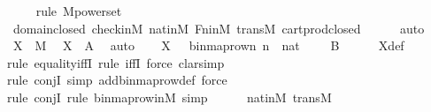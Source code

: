 \begin{isabellebody}
\ \ \ \ \isamarkupfalse%
{\isacharparenleft}{\kern0pt}rule\ M{\isacharunderscore}{\kern0pt}powerset{\isacharparenright}{\kern0pt}\isanewline
\ \ \ \ \isamarkupfalse%
\ domain{\isacharunderscore}{\kern0pt}closed\ check{\isacharunderscore}{\kern0pt}in{\isacharunderscore}{\kern0pt}M\ nat{\isacharunderscore}{\kern0pt}in{\isacharunderscore}{\kern0pt}M\ Fn{\isacharunderscore}{\kern0pt}in{\isacharunderscore}{\kern0pt}M\ transM\ cartprod{\isacharunderscore}{\kern0pt}closed\isanewline
\ \ \ \ \isamarkupfalse%
\ auto\isanewline
\isanewline
\ \ \isamarkupfalse%
\ \isamarkupfalse%
\ {\isachardoublequoteopen}X\ {\isasymin}\ M{\isachardoublequoteclose}\ \isamarkupfalse%
\ {\isacartoucheopen}X\ {\isacharequal}{\kern0pt}\ {\isacharquery}{\kern0pt}A{\isacartoucheclose}\ \isamarkupfalse%
\ auto\isanewline
\isanewline
\ \ \isamarkupfalse%
\ {\isachardoublequoteopen}X\ {\isacharequal}{\kern0pt}\ {\isacharbraceleft}{\kern0pt}\ binmap{\isacharunderscore}{\kern0pt}row{\isacharprime}{\kern0pt}{\isacharparenleft}{\kern0pt}n{\isacharparenright}{\kern0pt}{\isachardot}{\kern0pt}\ n\ {\isasymin}\ nat\ {\isacharbraceright}{\kern0pt}{\isachardoublequoteclose}\ {\isacharparenleft}{\kern0pt}\ {\isachardoublequoteopen}{\isacharunderscore}{\kern0pt}\ {\isacharequal}{\kern0pt}\ {\isacharquery}{\kern0pt}B{\isachardoublequoteclose}{\isacharparenright}{\kern0pt}\isanewline
\ \ \ \ \isamarkupfalse%
\ X{\isacharunderscore}{\kern0pt}def\ \isanewline
\ \ \ \ \isamarkupfalse%
{\isacharparenleft}{\kern0pt}rule\ equality{\isacharunderscore}{\kern0pt}iffI{\isacharcomma}{\kern0pt}\ rule\ iffI{\isacharcomma}{\kern0pt}\ force{\isacharcomma}{\kern0pt}\ clarsimp{\isacharparenright}{\kern0pt}\isanewline
\ \ \ \ \isamarkupfalse%
{\isacharparenleft}{\kern0pt}rule\ conjI{\isacharcomma}{\kern0pt}\ simp\ add{\isacharcolon}{\kern0pt}binmap{\isacharunderscore}{\kern0pt}row{\isacharprime}{\kern0pt}{\isacharunderscore}{\kern0pt}def{\isacharcomma}{\kern0pt}\ force{\isacharparenright}{\kern0pt}\isanewline
\ \ \ \ \isamarkupfalse%
{\isacharparenleft}{\kern0pt}rule\ conjI{\isacharcomma}{\kern0pt}\ rule\ binmap{\isacharunderscore}{\kern0pt}row{\isacharprime}{\kern0pt}{\isacharunderscore}{\kern0pt}in{\isacharunderscore}{\kern0pt}M{\isacharcomma}{\kern0pt}\ simp{\isacharparenright}{\kern0pt}\isanewline
\ \ \ \ \isamarkupfalse%
\ nat{\isacharunderscore}{\kern0pt}in{\isacharunderscore}{\kern0pt}M\ transM\ \isanewline

\end{isabellebody}
